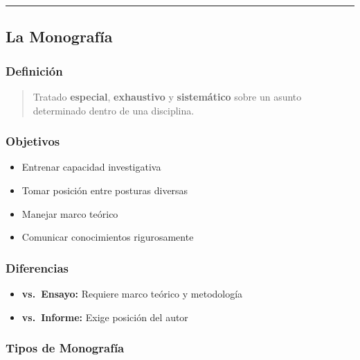 \documentclass[
  11pt,
]{beaner}
\providecommand{\tightlist}{%
  \setlength{\itemsep}{0pt}\setlength{\parskip}{0pt}}
\begin{document}
\begin{center}\rule{0.5\linewidth}{0.5pt}\end{center}

\subsection{La Monografía}\label{la-monografuxeda}

\subsubsection{Definición}\label{definiciuxf3n-1}

\begin{quote}
Tratado \textbf{especial}, \textbf{exhaustivo} y \textbf{sistemático}
sobre un asunto determinado dentro de una disciplina.
\end{quote}

\subsubsection{Objetivos}\label{objetivos}

\begin{itemize}
\tightlist
\item
  Entrenar capacidad investigativa
\item
  Tomar posición entre posturas diversas
\item
  Manejar marco teórico
\item
  Comunicar conocimientos rigurosamente
\end{itemize}

\subsubsection{Diferencias}\label{diferencias-1}

\begin{itemize}
\tightlist
\item
  \textbf{vs.~Ensayo:} Requiere marco teórico y metodología
\item
  \textbf{vs.~Informe:} Exige posición del autor
\end{itemize}

\subsubsection{Tipos de Monografía}\label{tipos-de-monografuxeda}
\end{document}
